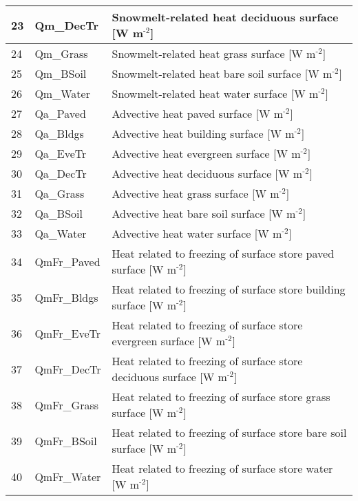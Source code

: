 \documentclass[letterpaper,10pt,english]{sphinxmanual}
\begin{document}
\begin{savenotes}
\begin{longtable}{|l|l|l|}
\hline
23
&
Qm\_DecTr
&
Snowmelt-related heat \textendash{} deciduous surface {[}W m$^{\text{-2}}${]}
\\
\hline
24
&
Qm\_Grass
&
Snowmelt-related heat \textendash{} grass surface {[}W m$^{\text{-2}}${]}
\\
\hline
25
&
Qm\_BSoil
&
Snowmelt-related heat \textendash{} bare soil surface {[}W m$^{\text{-2}}${]}
\\
\hline
26
&
Qm\_Water
&
Snowmelt-related heat \textendash{} water surface {[}W m$^{\text{-2}}${]}
\\
\hline
27
&
Qa\_Paved
&
Advective heat \textendash{} paved surface {[}W m$^{\text{-2}}${]}
\\
\hline
28
&
Qa\_Bldgs
&
Advective heat \textendash{} building surface {[}W m$^{\text{-2}}${]}
\\
\hline
29
&
Qa\_EveTr
&
Advective heat \textendash{} evergreen surface {[}W m$^{\text{-2}}${]}
\\
\hline
30
&
Qa\_DecTr
&
Advective heat \textendash{} deciduous surface {[}W m$^{\text{-2}}${]}
\\
\hline
31
&
Qa\_Grass
&
Advective heat \textendash{} grass surface {[}W m$^{\text{-2}}${]}
\\
\hline
32
&
Qa\_BSoil
&
Advective heat \textendash{} bare soil surface {[}W m$^{\text{-2}}${]}
\\
\hline
33
&
Qa\_Water
&
Advective heat \textendash{} water surface {[}W m$^{\text{-2}}${]}
\\
\hline
34
&
QmFr\_Paved
&
Heat related to freezing of surface store \textendash{} paved surface {[}W m$^{\text{-2}}${]}
\\
\hline
35
&
QmFr\_Bldgs
&
Heat related to freezing of surface store \textendash{} building surface {[}W m$^{\text{-2}}${]}
\\
\hline
36
&
QmFr\_EveTr
&
Heat related to freezing of surface store \textendash{} evergreen surface {[}W m$^{\text{-2}}${]}
\\
\hline
37
&
QmFr\_DecTr
&
Heat related to freezing of surface store \textendash{} deciduous surface {[}W m$^{\text{-2}}${]}
\\
\hline
38
&
QmFr\_Grass
&
Heat related to freezing of surface store \textendash{} grass surface {[}W m$^{\text{-2}}${]}
\\
\hline
39
&
QmFr\_BSoil
&
Heat related to freezing of surface store \textendash{} bare soil surface {[}W m$^{\text{-2}}${]}
\\
\hline
40
&
QmFr\_Water
&
Heat related to freezing of surface store \textendash{} water {[}W m$^{\text{-2}}${]}

\end{longtable}
\end{savenotes}
\end{document}

